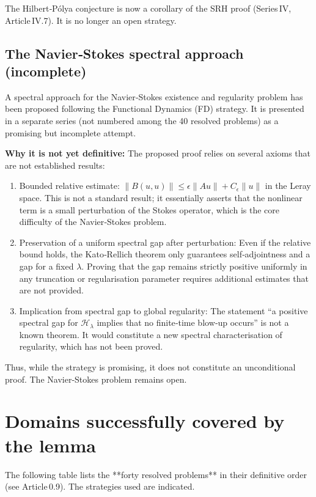 \documentclass[11pt,a4paper]{article}
\begin{document}
The Hilbert‑Pólya conjecture is now a corollary of the SRH proof (Series IV, Article IV.7). It is no longer an open strategy.

\subsection{The Navier‑Stokes spectral approach (incomplete)}

A spectral approach for the Navier‑Stokes existence and regularity problem has been proposed following the Functional Dynamics (FD) strategy. It is presented in a separate series (not numbered among the 40 resolved problems) as a promising but incomplete attempt.

\textbf{Why it is not yet definitive:} The proposed proof relies on several axioms that are not established results:
\begin{enumerate}
\item Bounded relative estimate: \(\| B(u,u)\| \leq \epsilon \| Au\| +C_{\epsilon}\| u\|\) in the Leray space. This is not a standard result; it essentially asserts that the nonlinear term is a small perturbation of the Stokes operator, which is the core difficulty of the Navier‑Stokes problem.
\item Preservation of a uniform spectral gap after perturbation: Even if the relative bound holds, the Kato‑Rellich theorem only guarantees self‑adjointness and a gap for a fixed \(\lambda\). Proving that the gap remains strictly positive uniformly in any truncation or regularisation parameter requires additional estimates that are not provided.
\item Implication from spectral gap to global regularity: The statement “a positive spectral gap for \(\mathcal{H}_{\lambda}\) implies that no finite‑time blow‑up occurs” is not a known theorem. It would constitute a new spectral characterisation of regularity, which has not been proved.
\end{enumerate}

Thus, while the strategy is promising, it does not constitute an unconditional proof. The Navier‑Stokes problem remains open.

\section{Domains successfully covered by the lemma}

The following table lists the **forty resolved problems** in their definitive order (see Article 0.9). The strategies used are indicated.
\end{document}
